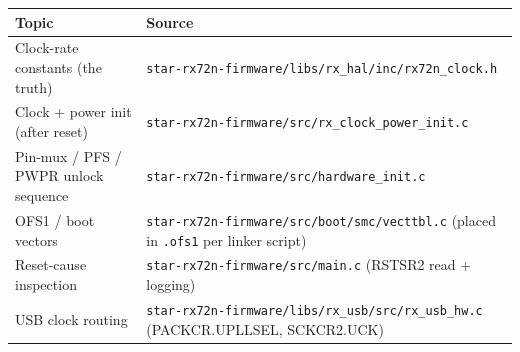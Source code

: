 \begin{center}
\begin{tabular}{|p{5.5cm}|p{8.5cm}|}
\hline
\textbf{Topic}                                & \textbf{Source}                                                                                                       \\
\hline
Clock-rate constants (the truth)              & \texttt{star-rx72n-firmware/libs/rx\_hal/inc/rx72n\_clock.h}                                                          \\
Clock + power init (after reset)              & \texttt{star-rx72n-firmware/src/rx\_clock\_power\_init.c}                                                              \\
Pin-mux / PFS / PWPR unlock sequence          & \texttt{star-rx72n-firmware/src/hardware\_init.c}                                                                      \\
OFS1 / boot vectors                            & \texttt{star-rx72n-firmware/src/boot/smc/vecttbl.c} (placed in \texttt{.ofs1} per linker script)                       \\
Reset-cause inspection                         & \texttt{star-rx72n-firmware/src/main.c} (RSTSR2 read + logging)                                                       \\
USB clock routing                              & \texttt{star-rx72n-firmware/libs/rx\_usb/src/rx\_usb\_hw.c} (PACKCR.UPLLSEL, SCKCR2.UCK)                                \\
\hline
\end{tabular}
\end{center}
